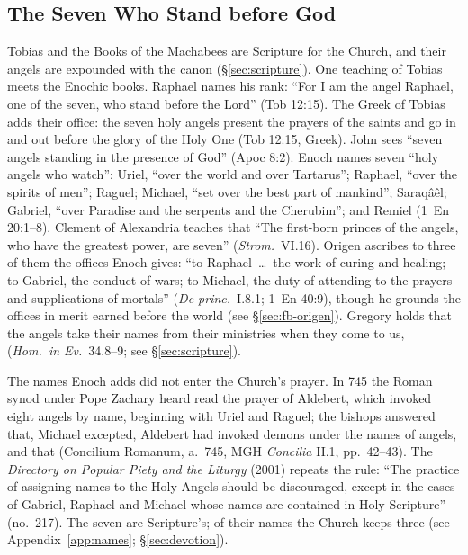 \sectionguard
\subsection{The Seven Who Stand before God}\label{sec:bc-seven}

Tobias and the Books of the Machabees are Scripture for the Church, and
their angels are expounded with the canon (\S\ref{sec:scripture}). One
teaching of Tobias meets the Enochic books. Raphael names his rank: ``For I
am the angel Raphael, one of the seven, who stand before the Lord'' (Tob
12:15). The Greek of Tobias adds their office: the seven holy angels present the
prayers of the saints and go in and out before the glory of the Holy One (Tob
12:15, Greek). John sees ``seven angels standing in the presence
of God'' (Apoc 8:2). Enoch names seven ``holy angels who watch'': Uriel,
``over the world and over Tartarus''; Raphael, ``over the spirits of men'';
Raguel; Michael, ``set over the best part of mankind''; Saraqâêl; Gabriel,
``over Paradise and the serpents and the Cherubim''; and Remiel (1~En
20:1--8). Clement of Alexandria teaches that ``The first-born princes of the
angels, who have the greatest power, are seven'' (\emph{Strom.}\ VI.16).
Origen ascribes to three of them the offices Enoch gives: ``to Raphael~\dots\
the work of curing and healing; to Gabriel, the conduct of wars; to Michael,
the duty of attending to the prayers and supplications of mortals''
(\emph{De princ.}\ I.8.1; 1~En 40:9), though he grounds the offices in
merit earned before the world (see \S\ref{sec:fb-origen}). Gregory holds
that the angels take their names from their ministries when they come to us,
\latin{apud nos etiam nomina a ministeriis trahunt} (\emph{Hom.\ in Ev.}\
34.8--9; see \S\ref{sec:scripture}).

The names Enoch adds did not enter the Church's prayer. In 745 the Roman
synod under Pope Zachary heard read the prayer of Aldebert, which invoked eight
angels by name, beginning with Uriel and Raguel; the bishops answered that,
Michael excepted, Aldebert had invoked demons under the names of angels, and
that
 (Concilium Romanum, a.~745, MGH \emph{Concilia} II.1, pp.~42--43).
The \emph{Directory on Popular Piety and the Liturgy} (2001) repeats the
rule: ``The practice of assigning names to the Holy Angels should be
discouraged, except in the cases of Gabriel, Raphael and Michael whose names
are contained in Holy Scripture'' (no.~217). The seven are Scripture's; of their
names the Church keeps three (see Appendix~\ref{app:names}; \S\ref{sec:devotion}).

